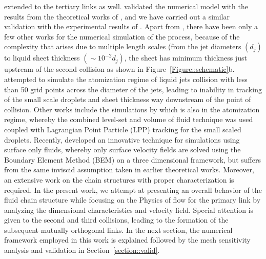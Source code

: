 \documentclass[%
aip,
sd,%
amsmath,amssymb,
preprint,%
author-year,%
]{revtex4-1}
\begin{document}
extended to the tertiary links as well. \cite{chen2013high} validated the numerical model with the results from the theoretical works of \cite{bremond2006atomization}, and we have carried out a similar validation with the experimental results of \cite{bush2004collision}. Apart from \cite{chen2013high}, there have been only a few other works for the numerical simulation of the process, because of the complexity that arises due to multiple length scales (from the jet diameters $\left(d_j\right)$ to liquid sheet thickness $\left(\sim 10^{-2}d_j\right)$, the sheet has minimum thickness just upstream of the second collision as shown in Figure~\ref{Figure::schematic}b. \cite{inoue2008study,inoue2009liquid} attempted to simulate the atomization regime of liquid jets collision with less than 50 grid points across the diameter of the jets, leading to inability in tracking of the small scale droplets and sheet thickness way downstream of the point of collision. Other works include the simulations by \cite{arienti2012coupled} which is also in the atomization regime, whereby the combined level-set and volume of fluid technique \citep{sussman2007sharp} was used coupled with Lagrangian Point Particle (LPP) tracking for the small scaled droplets. Recently, \cite{da2016surface} developed an innovative technique for simulations using surface only fluids, whereby only surface velocity fields are solved using the Boundary Element Method (BEM) on a three dimensional framework, but suffers from the same inviscid assumption taken in earlier theoretical works. Moreover, an extensive work on the chain structures with proper characterization is required. In the present work, we attempt at presenting an overall behavior of the fluid chain structure while focusing on the Physics of flow for the primary link by analyzing the dimensional characteristics and velocity field. Special attention is given to the second and third collisions, leading to the formation of the subsequent mutually orthogonal links. In the next section, the numerical framework employed in this work is explained followed by the mesh sensitivity analysis and validation in Section~\ref{section::valid}. 
\end{document}
